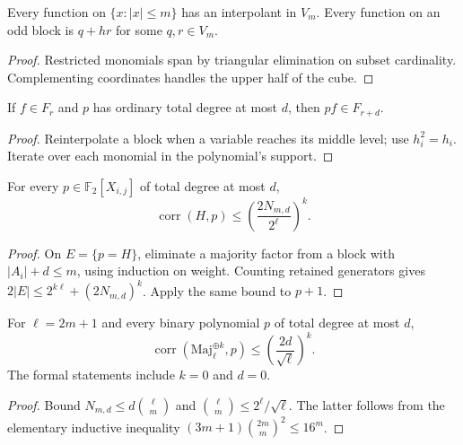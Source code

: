 \begin{lemma}
  \label{lem:analysis-polynomial-interpolation}
  \leanok
  Every function on $\{x:|x|\le m\}$ has an interpolant in $V_m$.
  Every function on an odd block is $q+hr$ for some $q,r\in V_m$.
\end{lemma}
\begin{proof}
  \leanok
  Restricted monomials span by triangular elimination on subset cardinality.
  Complementing coordinates handles the upper half of the cube.
\end{proof}

\begin{lemma}
  \label{lem:analysis-polynomial-multiplication}
  \leanok
  If $f\in F_r$ and $p$ has ordinary total degree at most $d$, then $pf\in F_{r+d}$.
\end{lemma}
\begin{proof}
  \leanok
  Reinterpolate a block when a variable reaches its middle level; use $h_i^2=h_i$.
  Iterate over each monomial in the polynomial's support.
\end{proof}

\begin{theorem}
  \label{thm:analysis-polynomial-correlation-finite}
  \leanok
  For every $p\in\mathbb F_2[X_{i,j}]$ of total degree at most $d$,
  \[
    \operatorname{corr}(H,p)\le \left(\frac{2N_{m,d}}{2^\ell}\right)^k.
  \]
\end{theorem}
\begin{proof}
  \leanok
  On $E=\{p=H\}$, eliminate a majority factor from a block with $|A_i|+d\le m$,
  using induction on weight. Counting retained generators gives
  $2|E|\le 2^{k\ell}+(2N_{m,d})^k$. Apply the same bound to $p+1$.
\end{proof}

\begin{theorem}
  \label{thm:analysis-polynomial-correlation}
  \leanok
  For $\ell=2m+1$ and every binary polynomial $p$ of total degree at most $d$,
  \[
    \operatorname{corr}(\mathrm{Maj}_\ell^{\oplus k},p)
      \le \left(\frac{2d}{\sqrt\ell}\right)^k.
  \]
  The formal statements include $k=0$ and $d=0$.
\end{theorem}
\begin{proof}
  \leanok
  Bound $N_{m,d}\le d\binom\ell m$ and
  $\binom\ell m\le 2^\ell/\sqrt\ell$.
  The latter follows from the elementary inductive inequality
  $(3m+1)\binom{2m}{m}^2\le16^m$.
\end{proof}

